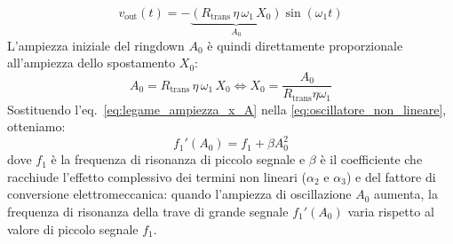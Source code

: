 \documentclass[11pt,a4paper]{article}
\begin{document}
\begin{equation}
    v_{\text{out}}(t) = - \underbrace{\left( R_{\text{trans}} \, \eta \, \omega_1 \, X_0 \right)}_{A_0} \sin(\omega_1 t)
\end{equation}
L'ampiezza iniziale del ringdown $A_0$ è quindi direttamente proporzionale all'ampiezza dello spostamento $X_0$:
\begin{equation}
    \label{eq:legame_ampiezza_x_A}
    A_0 = R_{\text{trans}} \, \eta \, \omega_1 \, X_0 \iff X_0 = \frac{A_0}{R_{\text{trans}} \eta \omega_1}
\end{equation}
Sostituendo l'eq.~\eqref{eq:legame_ampiezza_x_A} nella \eqref{eq:oscillatore_non_lineare}, otteniamo:
\begin{equation}
    \label{eq:backbone_legge}
    f_1'(A_0) = f_1 + \beta A_0^2
\end{equation}
dove $f_1$ è la frequenza di risonanza di piccolo segnale e $\beta$ è il coefficiente che racchiude l'effetto complessivo dei termini non lineari ($\alpha_2$ e $\alpha_3$) e del fattore di conversione elettromeccanica: quando l'ampiezza di oscillazione $A_0$ aumenta, la frequenza di risonanza della trave di grande segnale $f_1'(A_0)$ varia rispetto al valore di piccolo segnale $f_1$.
\end{document}

